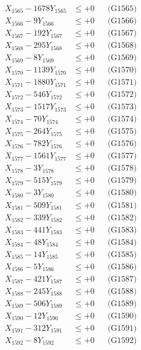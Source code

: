 \documentclass[a4paper,10pt]{article}
\begin{document}
{\begin{align}
X_{1565} - 1678Y_{1565} &\leq +0 && \text{(G1565)} \\
X_{1566} - 9Y_{1566} &\leq +0 && \text{(G1566)} \\
X_{1567} - 192Y_{1567} &\leq +0 && \text{(G1567)} \\
X_{1568} - 295Y_{1568} &\leq +0 && \text{(G1568)} \\
X_{1569} - 8Y_{1569} &\leq +0 && \text{(G1569)} \\
X_{1570} - 1139Y_{1570} &\leq +0 && \text{(G1570)} \\
\allowbreak
X_{1571} - 1880Y_{1571} &\leq +0 && \text{(G1571)} \\
X_{1572} - 546Y_{1572} &\leq +0 && \text{(G1572)} \\
X_{1573} - 1517Y_{1573} &\leq +0 && \text{(G1573)} \\
X_{1574} - 70Y_{1574} &\leq +0 && \text{(G1574)} \\
X_{1575} - 264Y_{1575} &\leq +0 && \text{(G1575)} \\
X_{1576} - 782Y_{1576} &\leq +0 && \text{(G1576)} \\
X_{1577} - 1561Y_{1577} &\leq +0 && \text{(G1577)} \\
X_{1578} - 3Y_{1578} &\leq +0 && \text{(G1578)} \\
X_{1579} - 515Y_{1579} &\leq +0 && \text{(G1579)} \\
X_{1580} - 3Y_{1580} &\leq +0 && \text{(G1580)} \\
\allowbreak
X_{1581} - 509Y_{1581} &\leq +0 && \text{(G1581)} \\
X_{1582} - 339Y_{1582} &\leq +0 && \text{(G1582)} \\
X_{1583} - 441Y_{1583} &\leq +0 && \text{(G1583)} \\
X_{1584} - 48Y_{1584} &\leq +0 && \text{(G1584)} \\
X_{1585} - 14Y_{1585} &\leq +0 && \text{(G1585)} \\
X_{1586} - 5Y_{1586} &\leq +0 && \text{(G1586)} \\
X_{1587} - 421Y_{1587} &\leq +0 && \text{(G1587)} \\
X_{1588} - 245Y_{1588} &\leq +0 && \text{(G1588)} \\
X_{1589} - 506Y_{1589} &\leq +0 && \text{(G1589)} \\
X_{1590} - 12Y_{1590} &\leq +0 && \text{(G1590)} \\
\allowbreak
X_{1591} - 312Y_{1591} &\leq +0 && \text{(G1591)} \\
X_{1592} - 8Y_{1592} &\leq +0 && \text{(G1592)} \\

\end{align}}
\end{document}

